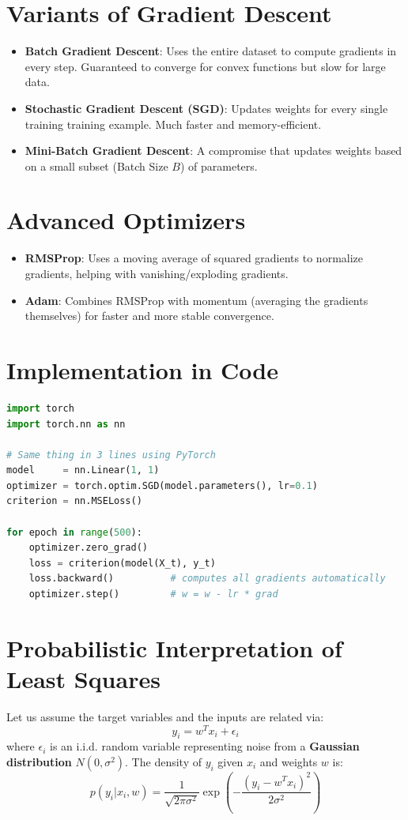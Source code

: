 \documentclass[11pt,fleqn]{book}
\begin{document}
\section{Variants of Gradient Descent}
\begin{itemize}
    \item \textbf{Batch Gradient Descent}: Uses the entire dataset to compute gradients in every step. Guaranteed to converge for convex functions but slow for large data.
    \item \textbf{Stochastic Gradient Descent (SGD)}: Updates weights for every single training training example. Much faster and memory-efficient.
    \item \textbf{Mini-Batch Gradient Descent}: A compromise that updates weights based on a small subset (Batch Size $B$) of parameters.
\end{itemize}

\section{Advanced Optimizers}
\begin{itemize}
    \item \textbf{RMSProp}: Uses a moving average of squared gradients to normalize gradients, helping with vanishing/exploding gradients.
    \item \textbf{Adam}: Combines RMSProp with momentum (averaging the gradients themselves) for faster and more stable convergence.
\end{itemize}

\section{Implementation in Code}
\begin{lstlisting}[language=Python]
import torch
import torch.nn as nn

# Same thing in 3 lines using PyTorch
model     = nn.Linear(1, 1)
optimizer = torch.optim.SGD(model.parameters(), lr=0.1)
criterion = nn.MSELoss()

for epoch in range(500):
    optimizer.zero_grad()
    loss = criterion(model(X_t), y_t)
    loss.backward()          # computes all gradients automatically
    optimizer.step()         # w = w - lr * grad
\end{lstlisting}

\section{Probabilistic Interpretation of Least Squares}
Let us assume the target variables and the inputs are related via:
\[y_i = w^Tx_i + \epsilon_i\]
where $\epsilon_i$ is an i.i.d. random variable representing noise from a \textbf{Gaussian distribution} $N(0, \sigma^2)$. The density of $y_i$ given $x_i$ and weights $w$ is:
\[p(y_i|x_i,w) = \frac{1}{\sqrt{2\pi\sigma^2}} \exp\left(-\frac{(y_i - w^Tx_i)^2}{2\sigma^2}\right)\]
\end{document}
